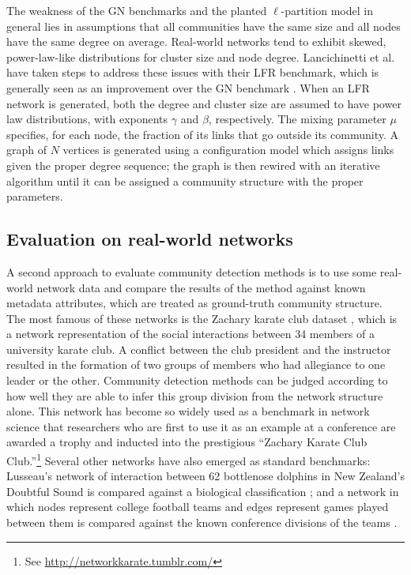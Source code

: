 The weakness of the GN benchmarks and the planted \(\ell\)-partition
model in general lies in assumptions that all communities have the same
size and all nodes have the same degree on average. Real-world networks
tend to exhibit skewed, power-law-like distributions for cluster size
and node degree. Lancichinetti et al. have taken steps to address these
issues with their LFR benchmark, which is generally seen as an
improvement over the GN benchmark
\autocites{lancichinetti_benchmark_2008}{fortunato_community_2010}. When
an LFR network is generated, both the degree and cluster size are
assumed to have power law distributions, with exponents \(\gamma\) and
\(\beta\), respectively. The mixing parameter \(\mu\) specifies, for
each node, the fraction of its links that go outside its community. A
graph of \(N\) vertices is generated using a configuration model which
assigns links given the proper degree sequence; the graph is then
rewired with an iterative algorithm until it can be assigned a community
structure with the proper parameters.

\subsection{Evaluation on real-world
networks}\label{evaluation-on-real-world-networks}

A second approach to evaluate community detection methods is to use some
real-world network data and compare the results of the method against
known metadata attributes, which are treated as ground-truth community
structure. The most famous of these networks is the Zachary karate club
dataset \autocite{zachary_information_1977}, which is a network
representation of the social interactions between 34 members of a
university karate club. A conflict between the club president and the
instructor resulted in the formation of two groups of members who had
allegiance to one leader or the other. Community detection methods can
be judged according to how well they are able to infer this group
division from the network structure alone. This network has become so
widely used as a benchmark in network science that researchers who are
first to use it as an example at a conference are awarded a trophy and
inducted into the prestigious ``Zachary Karate Club Club.''\footnote{See
  \url{http://networkkarate.tumblr.com/}} Several other networks have
also emerged as standard benchmarks: Lusseau's network of interaction
between 62 bottlenose dolphins in New Zealand's Doubtful Sound is
compared against a biological classification
\autocite{lusseau_emergent_2003}; and a network in which nodes represent
college football teams and edges represent games played between them is
compared against the known conference divisions of the teams
\autocite{girvan_community_2002}.

